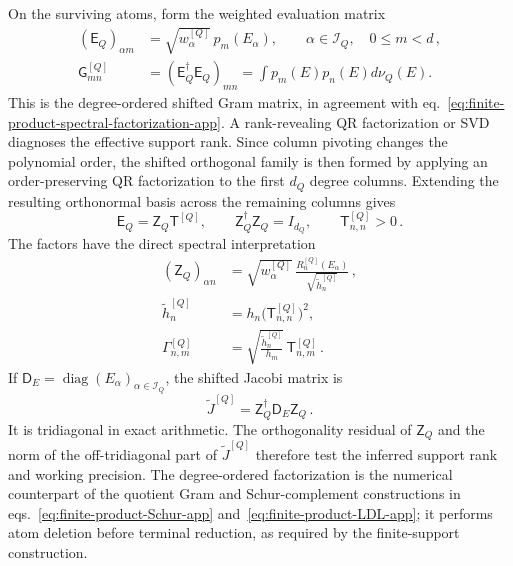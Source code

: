 \documentclass[a4paper,11pt]{article}
\def\dd{d}%
\def\Jac{J}%
\theoremstyle{definition}
\theoremstyle{remark}
\newcommand{\dd}{\mathrm d}
\newcommand{\Jac}{\mathsf J}
\newcommand{\diag}{\operatorname{diag}}
\newcommand{\thh}{\widetilde h}
\begin{document}
On the surviving atoms, form the weighted evaluation matrix 
\begin{equation}
\begin{aligned}
   (\mathsf E_Q)_{\alpha m}
   &=\sqrt{w_\alpha^{[Q]}}\,p_m(E_\alpha),
   \qquad
   \alpha\in\mathcal I_Q,\quad 0\le m<d\,,\\
   \mathsf G_{mn}^{[Q]}
   &=(\mathsf E_Q^\dagger\mathsf E_Q)_{mn}
   =\int p_m(E)p_n(E)\dd\nu_Q(E).
\end{aligned}
\end{equation}
This is the degree-ordered shifted Gram matrix, in agreement with
eq.~\eqref{eq:finite-product-spectral-factorization-app}.  A
rank-revealing QR factorization or SVD diagnoses the effective support
rank.  Since column pivoting changes the polynomial order, the shifted
orthogonal family is then formed by applying an order-preserving QR
factorization to the first $d_Q$ degree columns.  Extending the resulting
orthonormal basis across the remaining columns gives
\begin{equation}
   \mathsf E_Q=\mathsf Z_Q\mathsf T^{[Q]},
   \qquad
   \mathsf Z_Q^\dagger\mathsf Z_Q=I_{d_Q},
   \qquad
   \mathsf T_{n,n}^{[Q]}>0\,.
\end{equation}
The factors have the direct spectral interpretation
\begin{equation}
\begin{aligned}
   (\mathsf Z_Q)_{\alpha n}
   &=
   \sqrt{w_\alpha^{[Q]}}\,
   \frac{R_n^{[Q]}(E_\alpha)}
        {\sqrt{\thh_n^{[Q]}}}\,,\\
   \thh_n^{[Q]}
   &=h_n\bigl(\mathsf T_{n,n}^{[Q]}\bigr)^2,\\
   \Gamma_{n,m}^{[Q]}
   &=\sqrt{\frac{\thh_n^{[Q]}}{h_m}}\,
      \mathsf T_{n,m}^{[Q]}\,.
\end{aligned}
   \label{eq:numerical-finite-support-data-app}
\end{equation}
If $\mathsf D_E=\diag(E_\alpha)_{\alpha\in\mathcal I_Q}$, the shifted
Jacobi matrix is
\begin{equation}
   \widetilde\Jac^{[Q]}
   =\mathsf Z_Q^\dagger\mathsf D_E\mathsf Z_Q\,.
   \label{eq:numerical-finite-Jacobi-compression-app}
\end{equation}
It is tridiagonal in exact arithmetic.  The orthogonality residual of
$\mathsf Z_Q$ and the norm of the off-tridiagonal part of
$\widetilde\Jac^{[Q]}$ therefore test the inferred support rank and
working precision.  The degree-ordered factorization is the numerical
counterpart of the quotient Gram and Schur-complement constructions in
eqs.~\eqref{eq:finite-product-Schur-app}
and~\eqref{eq:finite-product-LDL-app}; it performs atom deletion before
terminal reduction, as required by the finite-support construction.
\end{document}
